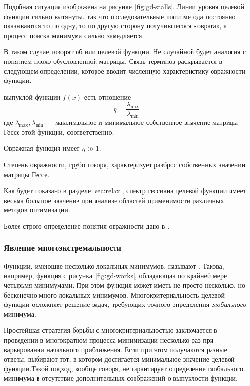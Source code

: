 Подобная ситуация изображена на рисунке \ref{fig:gd-stalls}. Линии
уровня целевой функции сильно вытянуты, так что последовательные шаги
метода \gd{} постоянно оказываются то по одну, то по другую сторону
получившегося «оврага», а процесс поиска минимума сильно замедляется.

В таком случае говорят об  или  целевой функции. Не случайной будет аналогия с
понятием плохо обусловленной матрицы. Связь терминов раскрывается в
следующем определении, которое вводит численную характеристику
овражности функции.

\begin{dfn}
  \label{dfn:ill-cond}
   выпуклой функции $f(x)$ есть отношение
  \begin{equation*}
    \eta = \frac{\lambda_{\max}}{\lambda_{\min}}
  \end{equation*}
  где $\lambda_{\max}, \lambda_{\min}$ — максимальное и минимальное
  собственное значение матрицы Гессе этой функции, соответственно.
\end{dfn}

Овражная функция имеет $\eta \gg 1$.

Степень овражности, грубо говоря, характеризует разброс собственных
значений матрицы Гессе. 

Как будет показано в разделе \ref{sec:relax}, спектр гессиана целевой
функции имеет весьма большое значение при анализе областей
применимости различных методов оптимизации.

Более строго определение понятия овражности дано в
\cite{chernorutsky04}.

\subsubsection{Явление многоэкстремальности}

Функции, имеющие несколько локальных минимумов, называют
. Такова, например, функция с
рисунка \ref{fig:gd-works}, обладающая по крайней мере четырьмя
минимумами. При этом функция может иметь не просто несколько, но
бесконечно много локальных минимумов. Многокритериальность целевой
функции осложняет решение задач, требующих точного определения
\emph{глобального} минимума.

Простейшая стратегия борьбы с многокритериальностью заключается в
проведении в многократном процесса минимизации несколько раз при
варьировании начального приближения. Если при этом получаются разные
ответы, выбирают тот, в котором достигается минимальное значение
целевой функции.Такой подход, вообще говоря, не гарантирует
определение глобального минимума в отсутствие дополнительных
соображений о выпуклости функции.
